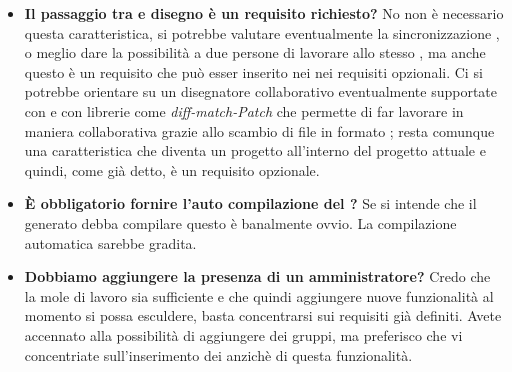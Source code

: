 \begin{itemize}
\\
	  		   	\item 
	   		\textbf{Il passaggio tra  e disegno è un requisito richiesto?}
	    	\justifying     		
No non è necessario questa caratteristica, si potrebbe valutare eventualmente la sincronizzazione , o meglio dare la possibilità a due persone di lavorare allo stesso  , ma anche questo è  un requisito che può esser inserito nei nei requisiti opzionali. Ci si potrebbe orientare su un disegnatore collaborativo eventualmente supportate con  e con librerie come \emph{diff-match-Patch} che permette di far lavorare in maniera collaborativa grazie allo scambio di file in formato ; resta comunque una caratteristica che diventa un progetto all'interno del progetto attuale e quindi, come già detto, è un requisito opzionale.
\\

	  		   	\item 
	   		\textbf{È obbligatorio fornire l'auto compilazione del ?}
	    	\justifying     		
Se si intende che il  generato debba compilare questo è banalmente ovvio. La compilazione automatica sarebbe gradita.
\\
		  		   	\item 
	   		\textbf{Dobbiamo aggiungere la presenza di un  amministratore?}
	    	\justifying     		
Credo che la mole di lavoro sia sufficiente e che quindi aggiungere nuove funzionalità al momento si possa esculdere, basta concentrarsi sui requisiti già definiti. Avete accennato alla possibilità di aggiungere dei gruppi, ma preferisco che vi concentriate sull'inserimento dei  anzichè di questa funzionalità.
\\
	   	 \end{itemize}
